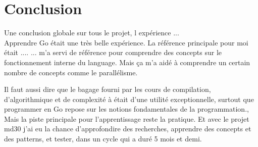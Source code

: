 \section{Conclusion}

Une conclusion globale sur tous le projet, l expérience ...\\
Apprendre Go était une très belle expérience. La référence principale
pour moi était .... 
... m'a servi de référence pour
comprendre des concepts sur le fonctionnement interne du language.
Mais ça m'a aidé à comprendre un certain nombre de concepts comme le parallélisme.

\bigskip
Il faut aussi dire que le bagage fourni par les cours de compilation, d'algorithmique et de complexité à
\establishment{} était d'une utilité exceptionnelle, surtout que
programmer en Go repose sur les notions fondamentales de la programmation., \\[0.3cm]
Mais la piste principale pour l'apprentissage reste la pratique. Et avec
le projet \gls{md30} j'ai eu la chance d'approfondire des recherches,
apprendre des concepts et des patterns, et tester, dans un cycle qui a
duré 5 mois et demi. 